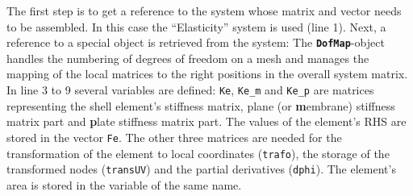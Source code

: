    The first step is to get a reference to the system whose matrix and vector needs to be assembled. In this case the ``Elasticity'' system is used (line 1). Next, a reference to a special object is retrieved from the system: The \texttt{\textbf{DofMap}}-object handles the numbering of degrees of freedom on a mesh and manages the mapping of the local matrices to the right positions in the overall system matrix. In line 3 to 9 several variables are defined: \texttt{Ke}, \texttt{Ke\_m} and \texttt{Ke\_p} are matrices representing the shell element's stiffness matrix, plane (or \textbf{m}embrane) stiffness matrix part and \textbf{p}late stiffness matrix part. The values of the element's RHS are stored in the vector \texttt{Fe}. The other three matrices are needed for the transformation of the element to local coordinates (\texttt{trafo}), the storage of the transformed nodes (\texttt{transUV}) and the partial derivatives (\texttt{dphi}). The element's area is stored in the variable of the same name.

